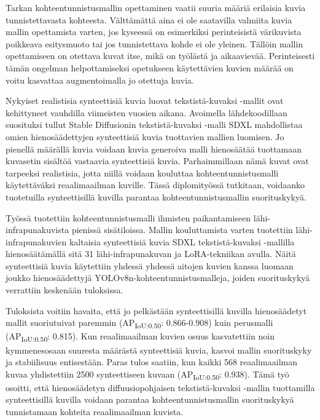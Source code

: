 Tarkan kohteentunnistusmallin opettaminen vaatii suuria määriä erilaisia kuvia tunnistettavasta kohteesta. Välttämättä aina ei ole saatavilla valmiita kuvia mallin opettamista varten, jos kyseessä on esimerkiksi perinteisistä värikuvista poikkeava esitysmuoto tai jos tunnistettava kohde ei ole yleinen. Tällöin mallin opettamiseen on otettava kuvat itse, mikä on työlästä ja aikaavievää. Perinteisesti tämän ongelman helpottamiseksi opetukseen käytettävien kuvien määrää on voitu kasvattaa augmentoimalla jo otettuja kuvia.

Nykyiset realistisia synteettisiä kuvia luovat tekstistä-kuvaksi -mallit ovat kehittyneet vauhdilla viimeisten vuosien aikana. Avoimella lähdekoodillaan suosituksi tullut Stable Diffusionin tekstistä-kuvaksi -malli SDXL mahdollistaa omien hienosäädettyjen synteettisiä kuvia tuottavien mallien luomisen. Jo pienellä määrällä kuvia voidaan kuvia generoiva malli hienosäätää tuottamaan kuvasetin sisältöä vastaavia synteettisiä kuvia. Parhaimmillaan nämä kuvat ovat tarpeeksi realistisia, jotta niillä voidaan kouluttaa kohteentunnistusmalli käytettäväksi reaalimaailman kuville. Tässä diplomityössä tutkitaan, voidaanko tuotetuilla synteettisillä kuvilla parantaa kohteentunnistusmallin suorituskykyä.

Työssä tuotettiin kohteentunnistusmalli ihmisten paikantamiseen lähi-infrapunakuvista pienissä sisätiloissa. Mallin kouluttamista varten tuotettiin lähi-infrapunakuvien kaltaisia synteettisiä kuvia SDXL tekstistä-kuvaksi -mallilla hienosäätämällä sitä 31 lähi-infrapunakuvan ja LoRA-tekniikan avulla. Näitä synteettisiä kuvia käytettiin yhdessä yhdessä aitojen kuvien kanssa luomaan joukko hienosäädettyjä YOLOv8n-kohteentunnistusmalleja, joiden suorituskykyä verrattiin keskenään tuloksissa.

Tuloksista voitiin havaita, että jo pelkästään synteettisillä kuvilla hienosäädetyt mallit suoriutuivat paremmin (AP\textsubscript{IoU:0.50}: 0.866-0.908) kuin perusmalli (AP\textsubscript{IoU:0.50}: 0.815). Kun reaalimaailman kuvien osuus kasvatettiin noin kymmenesosaan suuresta määrästä synteettisiä kuvia, kasvoi mallin suorituskyky ja stabiilisuus entisestään. Paras tulos saatiin, kun kaikki 568 reaalimaailman kuvaa yhdistettiin 2500 synteettiseen kuvaan (AP\textsubscript{IoU:0.50}: 0.938). Tämä työ osoitti, että hienosäädetyn diffuusiopohjaisen tekstistä-kuvaksi -mallin tuottamilla synteettisillä kuvilla voidaan parantaa kohteentunnistusmallin suorituskykyä tunnistamaan kohteita reaalimaailman kuvista.